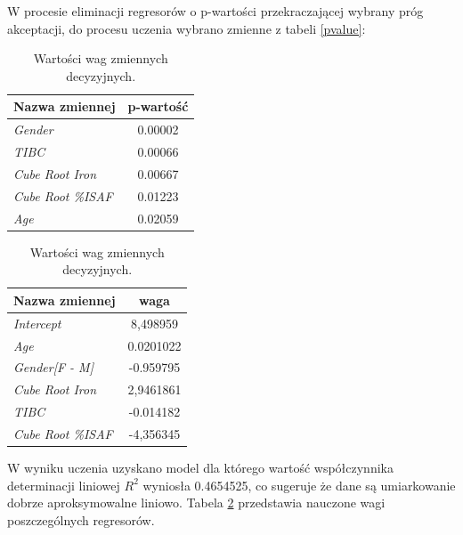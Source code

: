 W procesie eliminacji regresorów o p-wartości przekraczającej wybrany próg akceptacji, do procesu uczenia wybrano zmienne z tabeli \ref{pvalue}:

\begin{table}[!ht]
	\begin{minipage}{0.48\textwidth}
		\centering
		\begin{tabular}{l|c}
			Nazwa zmiennej & p-wartość \\
			\hline
			\textit{Gender} & 0.00002 \\
			\textit{TIBC} & 0.00066 \\
			\textit{Cube Root Iron} & 0.00667 \\
			\textit{Cube Root \%ISAF} & 0.01223 \\
			\textit{Age} & 0.02059
		\end{tabular}
		\caption{Wybrane zmienne decyzyjne i ich p-wartości.}
		\label{pvalue}
	\end{minipage}%
	\hspace{0.04\textwidth}
	\begin{minipage}{0.48\textwidth}
		\centering
		\begin{tabular}{l|c}
			Nazwa zmiennej & waga \\
			\hline
			\textit{Intercept} & 8,498959 \\
			\textit{Age} & 0.0201022 \\
			\textit{Gender[F - M]} & -0.959795 \\
			\textit{Cube Root Iron} & 2,9461861 \\
			\textit{TIBC} & -0.014182 \\
			\textit{Cube Root \%ISAF} & -4,356345
		\end{tabular}
		\caption{Wartości wag zmiennych decyzyjnych.}
		\label{weights}		
	\end{minipage}
\end{table}

W wyniku uczenia uzyskano model dla którego wartość współczynnika determinacji liniowej \textit{$R^2$} wyniosła 0.4654525, co sugeruje że dane są umiarkowanie dobrze aproksymowalne liniowo. Tabela \ref{weights} przedstawia nauczone wagi poszczególnych regresorów.